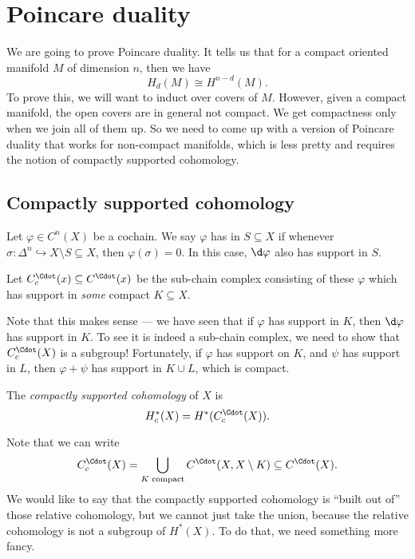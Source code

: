 \documentclass[a4paper]{article}
\begin{document}
\section{Poincare duality}
We are going to prove Poincare duality. It tells us that for a compact oriented manifold $M$ of dimension $n$, then we have
\[
  H_d(M) \cong H^{n - d}(M).
\]
To prove this, we will want to induct over covers of $M$. However, given a compact manifold, the open covers are in general not compact. We get compactness only when we join all of them up. So we need to come up with a version of Poincare duality that works for non-compact manifolds, which is less pretty and requires the notion of compactly supported cohomology.
\subsection{Compactly supported cohomology}

\begin{defi}
  Let $\varphi \in C^n(X)$ be a cochain. We say $\varphi$ has  in $S \subseteq X$ if whenever $\sigma: \Delta^n \hookrightarrow X \setminus S \subseteq X$, then $\varphi(\sigma) = 0$. In this case, $\d \varphi$ also has support in $S$.
\end{defi}

\begin{defi}
  Let $C_c^\Cdot(x) \subseteq C^\Cdot(x)$ be the sub-chain complex consisting of these $\varphi$ which has support in \emph{some} compact $K \subseteq X$.
\end{defi}
Note that this makes sense --- we have seen that if $\varphi$ has support in $K$, then $\d \varphi$ has support in $K$. To see it is indeed a sub-chain complex, we need to show that $C_c^\Cdot(X)$ is a subgroup! Fortunately, if $\varphi$ has support on $K$, and $\psi$ has support in $L$, then $\varphi + \psi$ has support in $K \cup L$, which is compact.

\begin{defi}
  The \emph{compactly supported cohomology} of $X$ is
  \[
    H^*_c(X) = H^*(C_c^\Cdot(X)).
  \]
\end{defi}

Note that we can write
\[
  C_c^{\Cdot}(X) = \bigcup_{K\text{ compact}} C^\Cdot(X, X \setminus K) \subseteq C^\Cdot(X).
\]
We would like to say that the compactly supported cohomology is ``built out of'' those relative cohomology, but we cannot just take the union, because the relative cohomology is not a subgroup of $H^*(X)$. To do that, we need something more fancy.
\end{document}
